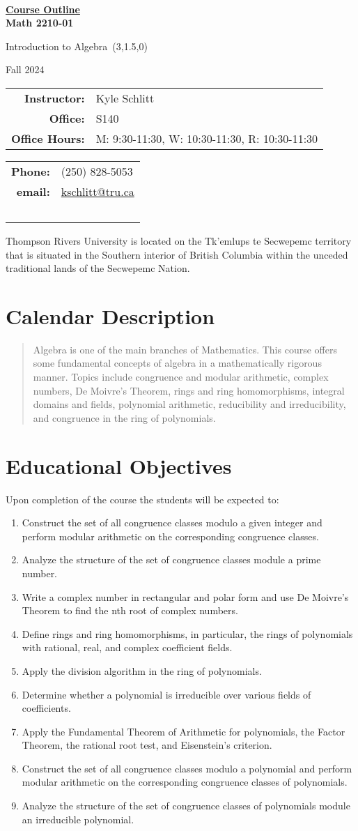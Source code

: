 \documentclass[10pt]{trumathoutline}
\makeatletter
\newcommand{\instructorname}     {Kyle Schlitt}
\newcommand{\instructorphone}    {(250) 828-5053}
\newcommand{\instructoremail}    {kschlitt@tru.ca}
\newcommand{\instructorofficehrs}{M: 9:30-11:30, W: 10:30-11:30, R: 10:30-11:30}
\newcommand{\instructorofficerm} {S140}
\newcommand{\coursecode}     	 {Math 2210-01}
\newcommand{\coursetitle}    	 {Introduction to Algebra}
\newcommand{\coursevectoring}	 {(3,1.5,0)}
\newcommand{\term}           	 {Fall 2024}
\newcommand{\calendardescription}{Algebra is one of the main branches of Mathematics. This course offers some fundamental concepts of algebra in a mathematically rigorous manner. Topics include congruence and modular arithmetic, complex numbers, De Moivre’s Theorem, rings and ring homomorphisms, integral domains and fields, polynomial arithmetic, reducibility and irreducibility, and congruence in the ring of polynomials.
}
\newcommand{\coursedescription}{
}
\newcommand{\courseobjectives}{
	\begin{enumerate}
		\item Construct the set of all congruence classes modulo a given integer and perform modular arithmetic on the corresponding congruence classes.
		\item Analyze the structure of the set of congruence classes module a prime number.
		\item	Write a complex number in rectangular and polar form and use De Moivre’s Theorem to find the nth root of complex numbers.
		\item Define rings and ring homomorphisms, in particular, the rings of polynomials with rational, real, and complex coefficient fields.
		\item Apply the division algorithm in the ring of polynomials.
		\item Determine whether a polynomial is irreducible over various fields of coefficients.
		\item Apply the Fundamental Theorem of Arithmetic for polynomials, the Factor Theorem, the rational root test, and Eisenstein’s criterion.
		\item Construct the set of all congruence classes modulo a polynomial and perform modular arithmetic on the corresponding congruence classes of polynomials.
		\item Analyze the structure of the set of congruence classes of polynomials module an irreducible polynomial.
	\end{enumerate}
}
\makeatother
\begin{document}
	
	~
	
	\vspace{-1em}
	
	\begin{center}
		\bfseries
		{\Large \underline{Course Outline}}\\[0.5em]
		
		\coursecode
		
		\coursetitle\ \coursevectoring
		
		\term
		
	\end{center}
\begin{tabular}{ r l}
	\textbf{Instructor:}	& \instructorname 	\\
	\textbf{Office:} 		& \instructorofficerm \\
	\textbf{Office Hours:} 	& \instructorofficehrs
\end{tabular}\hfill
\begin{tabular}{ r l}
	 \textbf{Phone:} & \instructorphone\\
	 \textbf{email:} & \href{mailto:\instructoremail}{\instructoremail}\\
	~
\end{tabular}

\vspace{1em}


Thompson Rivers University is located on the Tk’emlups te Secwepemc territory that is situated in the Southern interior of British Columbia within the unceded traditional lands of the Secwepemc Nation.

\section*{Calendar Description}
\begin{quote}
	\calendardescription
\end{quote}
	


\section*{Educational Objectives}
Upon completion of the course the students will be expected to:
\courseobjectives
\end{document}
